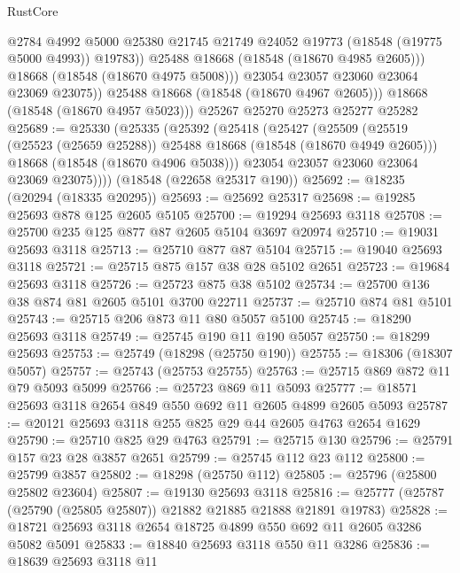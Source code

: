 \begin{lexlean}{RustCore}
\begin{coremodule}
                    @2784
                    @4992
                    @5000
                    @25380
                    @21745
                    @21749
                    @24052
                    @19773
                    (@18548 (@19775 @5000 @4993))
                    @19783))
                @25488
                @18668
                (@18548 (@18670 @4985 @2605)))
              @18668
              (@18548 (@18670 @4975 @5008)))
            @23054
            @23057
            @23060
            @23064
            @23069
            @23075))
        @25488
        @18668
        (@18548 (@18670 @4967 @2605)))
      @18668
      (@18548 (@18670 @4957 @5023)))
    @25267
    @25270
    @25273
    @25277
    @25282
@25689 := @25330
    (@25335
      (@25392
        (@25418
          (@25427
            (@25509
              (@25519 (@25523 (@25659 @25288)) @25488 @18668 (@18548 (@18670 @4949 @2605)))
              @18668
              (@18548 (@18670 @4906 @5038)))
            @23054
            @23057
            @23060
            @23064
            @23069
            @23075))))
    (@18548 (@22658 @25317 @190))
@25692 := @18235 (@20294 (@18335 @20295))
@25693 := @25692 @25317
@25698 := @19285 @25693 @878 @125 @2605 @5105
@25700 := @19294 @25693 @3118
@25708 := @25700 @235 @125 @877 @87 @2605 @5104 @3697 @20974
@25710 := @19031 @25693 @3118
@25713 := @25710 @877 @87 @5104
@25715 := @19040 @25693 @3118
@25721 := @25715 @875 @157 @38 @28 @5102 @2651
@25723 := @19684 @25693 @3118
@25726 := @25723 @875 @38 @5102
@25734 := @25700 @136 @38 @874 @81 @2605 @5101 @3700 @22711
@25737 := @25710 @874 @81 @5101
@25743 := @25715 @206 @873 @11 @80 @5057 @5100
@25745 := @18290 @25693 @3118
@25749 := @25745 @190 @11 @190 @5057
@25750 := @18299 @25693
@25753 := @25749 (@18298 (@25750 @190))
@25755 := @18306 (@18307 @5057)
@25757 := @25743 (@25753 @25755)
@25763 := @25715 @869 @872 @11 @79 @5093 @5099
@25766 := @25723 @869 @11 @5093
@25777 := @18571 @25693 @3118 @2654 @849 @550 @692 @11 @2605 @4899 @2605 @5093
@25787 := @20121 @25693 @3118 @255 @825 @29 @44 @2605 @4763 @2654 @1629
@25790 := @25710 @825 @29 @4763
@25791 := @25715 @130
@25796 := @25791 @157 @23 @28 @3857 @2651
@25799 := @25745 @112 @23 @112
@25800 := @25799 @3857
@25802 := @18298 (@25750 @112)
@25805 := @25796 (@25800 @25802 @23604)
@25807 := @19130 @25693 @3118
@25816 := @25777 (@25787 (@25790 (@25805 @25807)) @21882 @21885 @21888 @21891 @19783)
@25828 := @18721 @25693 @3118 @2654 @18725 @4899 @550 @692 @11 @2605 @3286 @5082 @5091
@25833 := @18840 @25693 @3118 @550 @11 @3286
@25836 := @18639 @25693 @3118 @11

\end{coremodule}
\end{lexlean}
